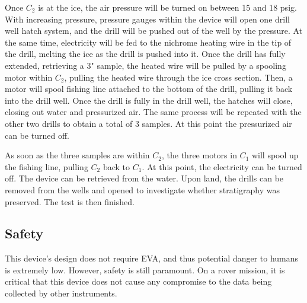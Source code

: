 \documentclass{article}
\begin{document}
Once $C_2$ is at the ice, the air pressure will be turned on between 15 and 18 psig. With increasing pressure, pressure gauges within the device will open one drill well hatch system, and the drill will be pushed out of the well by the pressure. At the same time, electricity will be fed to the nichrome heating wire in the tip of the drill, melting the ice as the drill is pushed into it. Once the drill has fully extended, retrieving a 3" sample, the heated wire will be pulled by a spooling motor within $C_2$, pulling the heated wire through the ice cross section. Then, a motor will spool fishing line attached to the bottom of the drill, pulling it back into the drill well. Once the drill is fully in the drill well, the hatches will close, closing out water and pressurized air. The same process will be repeated with the other two drills to obtain a total of 3 samples. At this point the pressurized air can be turned off.

As soon as the three samples are within $C_2$, the three motors in $C_1$ will spool up the fishing line, pulling $C_2$ back to $C_1$. At this point, the electricity can be turned off. The device can be retrieved from the water. Upon land, the drills can be removed from the wells and opened to investigate whether stratigraphy was preserved. The test is then finished.

\subsection{Safety}

This device’s design does not require EVA, and thus potential danger to humans is extremely low. However, safety is still paramount. On a rover mission, it is critical that this device does not cause any compromise to the data being collected by other instruments.
\end{document}
